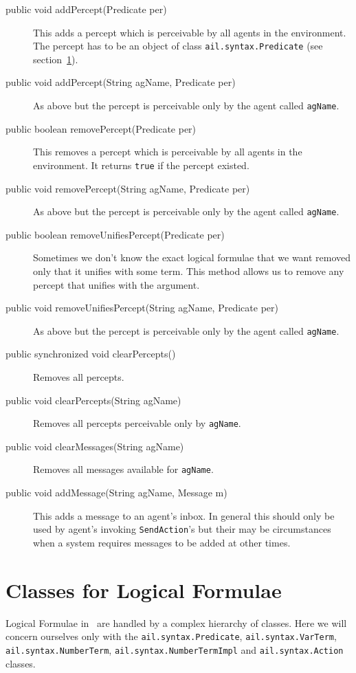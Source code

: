 \documentclass[a4]{article}
\begin{document}
\begin{description}
\item[public void addPercept(Predicate per)] This adds a percept which is perceivable by all agents in the environment.  The percept has to be an object of class \texttt{ail.syntax.Predicate} (see section~\ref{s:formulas}).
\item[public void addPercept(String agName, Predicate per)] As above but the percept is perceivable only by the agent called \texttt{agName}.
\item[public boolean removePercept(Predicate per)] This removes a percept which is perceivable by all agents in the environment.  It returns \texttt{true} if the percept existed.
\item[public void removePercept(String agName, Predicate per)] As above but the percept is perceivable only by the agent called \texttt{agName}.
\item[public boolean removeUnifiesPercept(Predicate per)]  Sometimes we don't know the exact logical formulae that we want removed only that it unifies with some term.  This method allows us to remove any percept that unifies with the argument.
\item[public void removeUnifiesPercept(String agName, Predicate per)] As above but the percept is perceivable only by the agent called \texttt{agName}.
\item[public synchronized void clearPercepts()] Removes all percepts.
\item[public void clearPercepts(String agName)] Removes all percepts perceivable only by \texttt{agName}.
\item[public void clearMessages(String agName)] Removes all messages available for \texttt{agName}.
\item[public void addMessage(String agName, Message m)] This adds a message to an agent's inbox.  In general this should only be used by agent's invoking \texttt{SendAction}'s but their may be circumstances when a system requires messages to be added at other times.
\end{description}

\section{Classes for Logical Formulae}
\label{s:formulas}

Logical Formulae in \ail\ are handled by a complex hierarchy of classes.  Here we will concern ourselves only with the \texttt{ail.syntax.Predicate}, \texttt{ail.syntax.VarTerm}, \texttt{ail.syntax.NumberTerm}, \texttt{ail.syntax.NumberTermImpl} and \texttt{ail.syntax.Action} classes.
\end{document}
